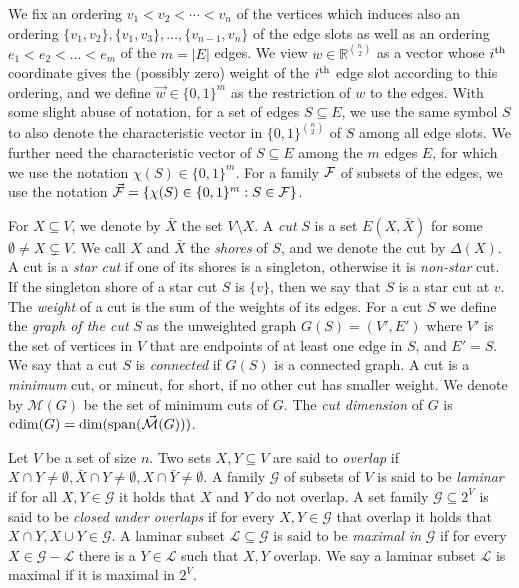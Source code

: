 \documentclass[10pt,a4paper]{article}
\newcommand{\R}{\mathbb{R}}
\newcommand{\Lcal}{\mathcal{L}}
\newcommand{\M}{\mathcal{M}}
\newcommand{\Gcal}{\mathcal{G}}
\newcommand{\laspan}{\mathrm{span}}
\newcommand{\ith}{i^{\scriptsize \mbox{{\rm th}}}}
\newcommand{\cd}{\mathrm{cdim}}
\newcommand{\1}{\mathbf{1}}
\theoremstyle{definition}
\begin{document}
We fix an ordering
$v_1 < v_2 < \cdots < v_n$ of the vertices which induces also an ordering $\{v_1, v_2\}, \{v_1, v_3\}, \ldots, \{v_{n-1},v_n\}$ of the edge slots as well as an ordering $e_1 < e_2 < \ldots < e_m$ of the $m=|E|$ edges.  We view $w \in \R^{\binom{n}{2}}$ as a vector whose $\ith$ coordinate gives the (possibly zero) weight of the $\ith$ edge slot
according to this ordering,
and we define $\vec{w} \in \{0,1\}^m$ as the restriction of $w$ to the edges.
With some slight abuse of notation, for a set of edges $S \subseteq E$, we use the same symbol $S$ to also denote
the characteristic vector in $\{0,1\}^{\binom{n}{2}}$ of $S$ among all edge slots.
We further need the characteristic vector of $S \subseteq E$ among the $m$ edges $E$, for which we use the
notation $\chi(S) \in \{0,1\}^m$.
For a family ${\cal F}$ of subsets of the edges, we use the notation
$\vec{{\cal F}} = \{ \chi(S) \in \{0,1\}^m : S \in {\cal F}\}$.


For $X \subseteq V$, we denote by $\bar{X}$ the set $V \setminus X$.
A {\em cut} $S$ is a set $E(X, \bar{X})$ for some $\emptyset \neq X \subsetneq V$.
We call
$X$ and $\bar{X}$ the {\em shores} of $S$, and we denote the cut by $\Delta(X)$.
A cut is a {\em star cut} if one of its shores is a singleton,
otherwise it is {\em non-star} cut. If the singleton shore of a star cut $S$ is $\{v\}$, then we say that $S$ is a star cut
at $v$.  The {\em weight} of a cut is the sum of the weights of its edges.
For a cut $S$ we define the {\em graph of the cut} $S$ as the unweighted graph $G(S)= (V', E')$
where $V'$ is the set of vertices in $V$
that are endpoints of at least one edge in $S$, and $E'=S$.
We say that a cut $S$ is
{\em connected} if $G(S)$ is a connected graph.
A cut is a {\em minimum} cut, or mincut, for short, if no other cut has smaller weight.
We denote by $\M(G)$ be the set of minimum cuts of $G$.
The {\em cut dimension} of $G$ is $\cd(G) = \dim(\laspan(\vec{\cal{M}}(G)))$.

Let $V$ be a set of size $n$. Two sets $X,Y \subseteq V$ are said to \emph{overlap} if $X \cap Y \ne \emptyset, \bar{X} \cap Y \ne \emptyset,
X \cap \bar{Y} \ne \emptyset$.
 A family $\Gcal$ of subsets of $V$ is said to be \emph{laminar} if for all $X,Y \in \Gcal$
it holds that $X$ and $Y$ do not overlap. A set family $\Gcal \subseteq 2^{V}$ is said to be \emph{closed under overlaps}
if for every $X,Y \in \Gcal$ that overlap it holds
that $X \cap Y, X \cup Y \in \Gcal$.  A laminar subset $\Lcal \subseteq \Gcal$ is said to be \emph{maximal in} $\Gcal$ if for every $X \in \Gcal - \Lcal$
there is a $Y \in \Lcal$ such that $X,Y$ overlap.  We say a laminar subset $\Lcal$ is maximal if it is maximal in $2^{V}$.
\end{document}
